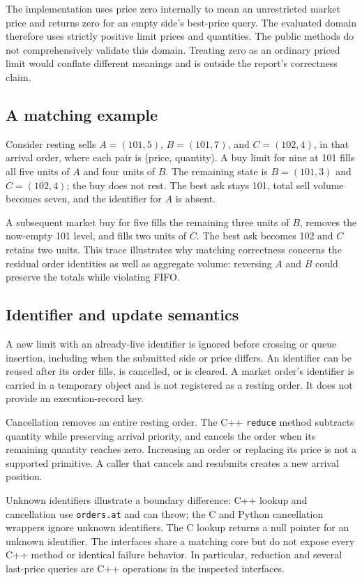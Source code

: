 \documentclass[10pt,letterpaper,twocolumn]{article}
\newcommand{\code}[1]{\texttt{#1}}
\begin{document}
The implementation uses price zero internally to mean an unrestricted market
price and returns zero for an empty side's best-price query. The evaluated
domain therefore uses strictly positive limit prices and quantities. The
public methods do not comprehensively validate this domain. Treating zero
as an ordinary priced limit would conflate different meanings and is outside
the report's correctness claim.

\subsection{A matching example}
Consider resting sells $A=(101,5)$, $B=(101,7)$, and $C=(102,4)$, in that
arrival order, where each pair is (price, quantity). A buy limit for nine at
101 fills all five units of $A$ and four units of $B$. The remaining state is
$B=(101,3)$ and $C=(102,4)$; the buy does not rest. The best ask stays 101,
total sell volume becomes seven, and the identifier for $A$ is absent.

A subsequent market buy for five fills the remaining three units of $B$,
removes the now-empty 101 level, and fills two units of $C$. The best ask
becomes 102 and $C$ retains two units. This trace illustrates why matching
correctness concerns the residual order identities as well as aggregate
volume: reversing $A$ and $B$ could preserve the totals while violating FIFO.

\subsection{Identifier and update semantics}
A new limit with an already-live identifier is ignored before crossing or
queue insertion, including when the submitted side or price differs. An
identifier can be reused after its order fills, is cancelled, or is cleared.
A market order's identifier is carried in a temporary object and is not
registered as a resting order. It does not provide an execution-record key.

Cancellation removes an entire resting order. The C++ \code{reduce} method
subtracts quantity while preserving arrival priority, and cancels the order
when its remaining quantity reaches zero. Increasing an order or replacing
its price is not a supported primitive. A caller that cancels and resubmits
creates a new arrival position.

Unknown identifiers illustrate a boundary difference: C++ lookup and
cancellation use \code{orders.at} and can throw; the C and Python cancellation
wrappers ignore unknown identifiers. The C lookup returns a null pointer for
an unknown identifier. The interfaces share a matching core but do not expose
every C++ method or identical failure behavior. In particular, reduction and
several last-price queries are C++ operations in the inspected interfaces.
\end{document}
